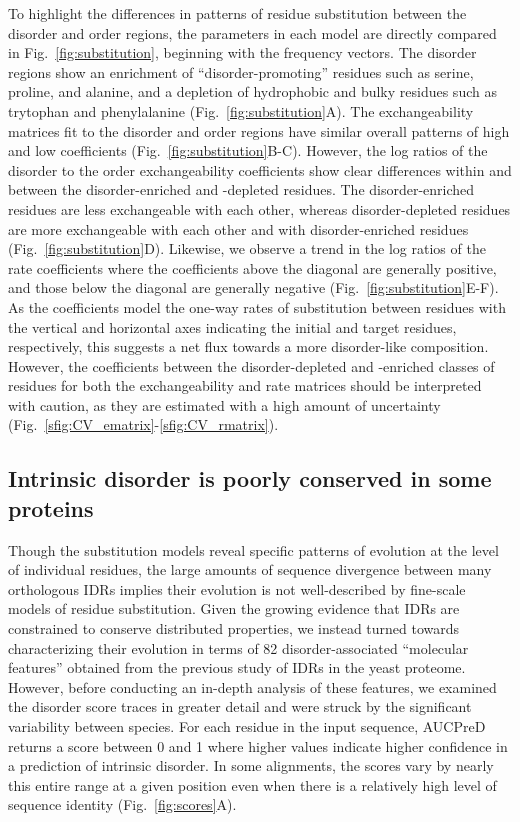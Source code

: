 To highlight the differences in patterns of residue substitution between the disorder and order regions, the parameters in each model are directly compared in Fig.~\ref{fig:substitution}, beginning with the frequency vectors. The disorder regions show an enrichment of ``disorder-promoting'' residues such as serine, proline, and alanine, and a depletion of hydrophobic and bulky residues such as trytophan and phenylalanine (Fig.~\ref{fig:substitution}A). The exchangeability matrices fit to the disorder and order regions have similar overall patterns of high and low coefficients (Fig.~\ref{fig:substitution}B-C). However, the log ratios of the disorder to the order exchangeability coefficients show clear differences within and between the disorder-enriched and -depleted residues. The disorder-enriched residues are less exchangeable with each other, whereas disorder-depleted residues are more exchangeable with each other and with disorder-enriched residues (Fig.~\ref{fig:substitution}D). Likewise, we observe a trend in the log ratios of the rate coefficients where the coefficients above the diagonal are generally positive, and those below the diagonal are generally negative (Fig.~\ref{fig:substitution}E-F). As the coefficients model the one-way rates of substitution between residues with the vertical and horizontal axes indicating the initial and target residues, respectively, this suggests a net flux towards a more disorder-like composition. However, the coefficients between the disorder-depleted and -enriched classes of residues for both the exchangeability and rate matrices should be interpreted with caution, as they are estimated with a high amount of uncertainty (Fig.~\ref{sfig:CV_ematrix}-\ref{sfig:CV_rmatrix}).

\subsection{Intrinsic disorder is poorly conserved in some proteins}
Though the substitution models reveal specific patterns of evolution at the level of individual residues, the large amounts of sequence divergence between many orthologous IDRs implies their evolution is not well-described by fine-scale models of residue substitution. Given the growing evidence that IDRs are constrained to conserve distributed properties, we instead turned towards characterizing their evolution in terms of 82 disorder-associated ``molecular features'' obtained from the previous study of IDRs in the yeast proteome. However, before conducting an in-depth analysis of these features, we examined the disorder score traces in greater detail and were struck by the significant variability between species. For each residue in the input sequence, AUCPreD returns a score between 0 and 1 where higher values indicate higher confidence in a prediction of intrinsic disorder. In some alignments, the scores vary by nearly this entire range at a given position even when there is a relatively high level of sequence identity (Fig.~\ref{fig:scores}A).

